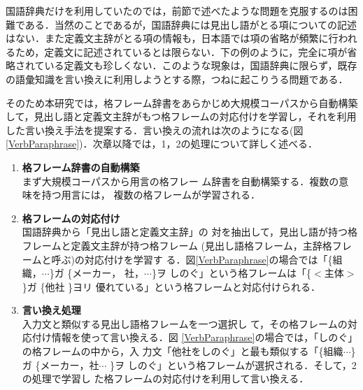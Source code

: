 \begin{figure*}[t]
 \begin{center}
  
  \caption{格フレームの対応付けに基づく用言の言い換え}
  \label{VerbParaphrase}
 \end{center}
\end{figure*}


国語辞典だけを利用していたのでは，前節で述べたような問題を克服するのは困
難である．当然のことであるが，国語辞典には見出し語がとる項についての記述
はない．また定義文主辞がとる項の情報も，日本語では項の省略が頻繁に行われ
るため，定義文に記述されているとは限らない．下の例のように，完全に項が省
略されている定義文も珍しくない．このような現象は，国語辞典に限らず，既存
の語彙知識を言い換えに利用しようとする際，つねに起こりうる問題である．


そのため本研究では，格フレーム辞書をあらかじめ大規模コーパスから自動構築
して，見出し語と定義文主辞がもつ格フレームの対応付けを学習し，それを利用
した言い換え手法を提案する．言い換えの流れは次のようになる(図 \ref{VerbParaphrase})．次章以降では，1，2の処理について詳しく述べる．

\begin{enumerate}
\item {\bf 格フレーム辞書の自動構築\\}まず大規模コーパスから用言の格フレー
      ム辞書を自動構築する\cite{Kawahara01}．複数の意味を持つ用言には，
      複数の格フレームが学習される．

\item {\bf 格フレームの対応付け\\}国語辞典から「見出し語と定義文主辞」の
      対を抽出して，見出し語が持つ格フレームと定義文主辞が持つ格フレーム
      (見出し語格フレーム，主辞格フレームと呼ぶ)の対応付けを学習す
      る．図\ref{VerbParaphrase}の場合では「\{組織，$\cdots$\}ガ \{メーカー，
      社，$\cdots$\}ヲ しのぐ」という格フレームは「\{$<$主体$>$\}ガ \{他社
      \}ヨリ 優れている」という格フレームと対応付けられる．
      
\item {\bf 言い換え処理\\}入力文と類似する見出し語格フレームを一つ選択し
      て，その格フレームの対応付け情報を使って言い換える．図
      \ref{VerbParaphrase}の場合では，「しのぐ」の格フレームの中から，入
      力文「他社をしのぐ」と最も類似する「\{組織$\cdots$\}ガ \{メーカー，社$\cdots$
      \}ヲ しのぐ」という格フレームが選択される．そして，2の処理で学習し
      た格フレームの対応付けを利用して言い換える．
\end{enumerate}




